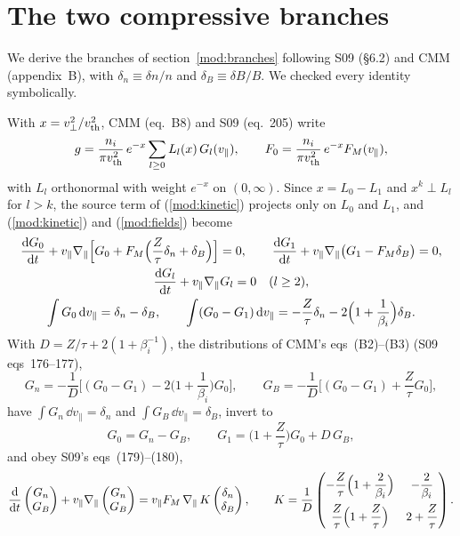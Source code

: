 \section{The two compressive branches}\label{app:branches}

We derive the branches of section~\ref{mod:branches} following S09 (\S6.2) and CMM (appendix~B), with $\delta_n\equiv\delta n/n$ and $\delta_B\equiv\delta B/B$. We checked every identity symbolically.

With $x=v_\perp^2/v_{\mathrm{th}}^2$, CMM (eq.~B8) and S09 (eq.~205) write
\begin{equation*}
  g=\frac{n_i}{\pi v_{\mathrm{th}}^2}\,e^{-x}\sum_{l\ge0}L_l(x)\,G_l(v_\parallel),\qquad
  F_0=\frac{n_i}{\pi v_{\mathrm{th}}^2}\,e^{-x}F_M(v_\parallel),
\end{equation*}
with $L_l$ orthonormal with weight $e^{-x}$ on $(0,\infty)$. Since $x=L_0-L_1$ and $x^k\perp L_l$ for $l>k$, the source term of (\ref{mod:kinetic}) projects only on $L_0$ and $L_1$, and (\ref{mod:kinetic}) and (\ref{mod:fields}) become
\begin{gather*}
  \frac{\mathrm{d} G_0}{\mathrm{d} t}+v_\parallel\nabla_\parallel\Big[G_0+F_M\Big(\frac{Z}{\tau}\delta_n+\delta_B\Big)\Big]=0,\qquad
  \frac{\mathrm{d} G_1}{\mathrm{d} t}+v_\parallel\nabla_\parallel\big(G_1-F_M\delta_B\big)=0,\\
  \frac{\mathrm{d} G_l}{\mathrm{d} t}+v_\parallel\nabla_\parallel G_l=0\quad(l\ge2),\\
  \int G_0\,\mathrm{d} v_\parallel=\delta_n-\delta_B,\qquad
  \int(G_0-G_1)\,\mathrm{d} v_\parallel=-\frac{Z}{\tau}\delta_n-2\Big(1+\frac{1}{\beta_i}\Big)\delta_B .
\end{gather*}
With $D=Z/\tau+2(1+\beta_i^{-1})$, the distributions of CMM's eqs~(B2)--(B3) (S09 eqs~176--177),
\begin{equation*}
  G_n=-\frac{1}{D}\Big[(G_0-G_1)-2\Big(1+\frac{1}{\beta_i}\Big)G_0\Big],\qquad
  G_B=-\frac{1}{D}\Big[(G_0-G_1)+\frac{Z}{\tau}G_0\Big],
\end{equation*}
have $\int G_n\,\dd v_\parallel=\delta_n$ and $\int G_B\,\dd v_\parallel=\delta_B$, invert to
\begin{equation}\label{appA:G01}
  G_0=G_n-G_B,\qquad G_1=\Big(1+\frac{Z}{\tau}\Big)G_0+D\,G_B ,
\end{equation}
and obey S09's eqs~(179)--(180),
\begin{equation*}
  \frac{\mathrm{d}}{\mathrm{d} t}\begin{pmatrix}G_n\\ G_B\end{pmatrix}+v_\parallel\nabla_\parallel\begin{pmatrix}G_n\\ G_B\end{pmatrix}
  =v_\parallel F_M\,\nabla_\parallel\,K\begin{pmatrix}\delta_n\\ \delta_B\end{pmatrix},\qquad
  K=\frac{1}{D}\begin{pmatrix}-\dfrac{Z}{\tau}\Big(1+\dfrac{2}{\beta_i}\Big) & -\dfrac{2}{\beta_i}\\[10pt]
  \dfrac{Z}{\tau}\Big(1+\dfrac{Z}{\tau}\Big) & 2+\dfrac{Z}{\tau}\end{pmatrix}.
\end{equation*}
